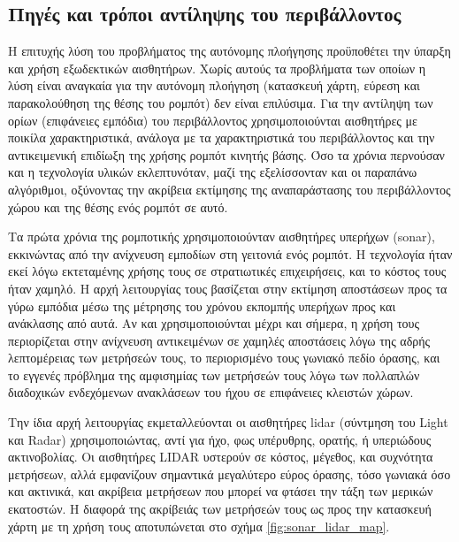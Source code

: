 \subsection{Πηγές και τρόποι αντίληψης του περιβάλλοντος}

Η επιτυχής λύση του προβλήματος της αυτόνομης πλοήγησης προϋποθέτει την ύπαρξη
και χρήση εξωδεκτικών αισθητήρων. Χωρίς αυτούς τα προβλήματα των οποίων η λύση
είναι αναγκαία για την αυτόνομη πλοήγηση (κατασκευή χάρτη, εύρεση και
παρακολούθηση της θέσης του ρομπότ) δεν είναι επιλύσιμα. Για την αντίληψη των
ορίων (επιφάνειες εμπόδια) του περιβάλλοντος χρησιμοποιούνται αισθητήρες με
ποικίλα χαρακτηριστικά, ανάλογα με τα χαρακτηριστικά του περιβάλλοντος και
την αντικειμενική επιδίωξη της χρήσης ρομπότ κινητής βάσης. Όσο τα χρόνια
περνούσαν και η τεχνολογία υλικών εκλεπτυνόταν, μαζί της εξελίσσονταν και
οι παραπάνω αλγόριθμοι, οξύνοντας την ακρίβεια εκτίμησης της αναπαράστασης
του περιβάλλοντος χώρου και της θέσης ενός ρομπότ σε αυτό.

Τα πρώτα χρόνια της ρομποτικής χρησιμοποιούνταν αισθητήρες υπερήχων (sonar),
εκκινώντας από την ανίχνευση εμποδίων στη γειτονιά ενός ρομπότ. Η τεχνολογία
ήταν εκεί λόγω εκτεταμένης χρήσης τους σε στρατιωτικές επιχειρήσεις, και το
κόστος τους ήταν χαμηλό. Η αρχή λειτουργίας τους βασίζεται στην εκτίμηση
αποστάσεων προς τα γύρω εμπόδια μέσω της μέτρησης του χρόνου εκπομπής υπερήχων
προς και ανάκλασης από αυτά. Αν και χρησιμοποιούνται μέχρι και σήμερα, η χρήση
τους περιορίζεται στην ανίχνευση αντικειμένων σε χαμηλές αποστάσεις λόγω της
αδρής λεπτομέρειας των μετρήσεών τους, το περιορισμένο τους γωνιακό πεδίο
όρασης, και το εγγενές πρόβλημα της αμφισημίας των μετρήσεών τους λόγω των
πολλαπλών διαδοχικών ενδεχόμενων ανακλάσεων του ήχου σε επιφάνειες κλειστών
χώρων.

Την ίδια αρχή λειτουργίας εκμεταλλεύονται οι αισθητήρες lidar (σύντμηση του
Light και Radar) χρησιμοποιώντας, αντί για ήχο, φως υπέρυθρης, ορατής, ή
υπεριώδους ακτινοβολίας. Οι αισθητήρες LIDAR υστερούν σε κόστος, μέγεθος, και
συχνότητα μετρήσεων, αλλά εμφανίζουν σημαντικά μεγαλύτερο εύρος όρασης, τόσο
γωνιακά όσο και ακτινικά, και ακρίβεια μετρήσεων που μπορεί να φτάσει την τάξη
των μερικών εκατοστών. Η διαφορά της ακρίβειάς των μετρήσεών τους ως προς την
κατασκευή χάρτη με τη χρήση τους αποτυπώνεται στο σχήμα
\ref{fig:sonar_lidar_map}.

